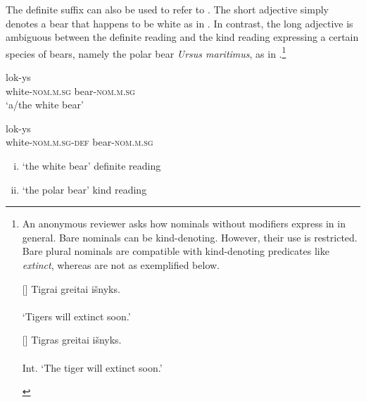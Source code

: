 \documentclass[output=paper,
modfonts
]{langscibook}
\begin{document}
The definite suffix can also be used to refer to  \citep{Rutkowski06}. The short adjective simply denotes a bear that happens to be white as in . \pagebreak In contrast, the long adjective is ambiguous between the definite reading and the kind reading expressing a certain species of bears, namely the polar bear \textit{Ursus maritimus}, as in .\footnote{An anonymous reviewer asks how nominals without modifiers express  in  in general. Bare nominals can be kind-denoting. However, their use is restricted. Bare plural nominals are compatible with kind-denoting predicates like \textit{extinct}, whereas  are not as exemplified below.
	
\begin{exe}
 
\begin{xlist}
[]{\footnotesize
	\gll Tigrai greitai išnyks.\\
  \\
\trans \normalfont `Tigers will extinct soon.'}

[\fts{\#}]{\footnotesize
	\gll Tigras greitai išnyks.\\
  \\
\trans \normalfont Int. `The tiger will extinct soon.'}
\end{xlist}
\end{exe}}

\begin{exe}
\ex \label{ex:sereikaite:11}
\begin{xlist}
\ex \label{ex:sereikaite:11a}
 {lok-ys} \\
white-\textsc{nom.m.sg} bear-\textsc{nom.m.sg} \\
\trans `a/the white bear'  

\ex \label{ex:sereikaite:11b}
 {lok-ys}\\
white-\textsc{nom.m.sg}-\textsc{def} bear-\textsc{nom.m.sg}  \\
\trans 
\begin{enumerate}[(i)]
	\item `the white bear' \checkmark definite reading 
	\item `the polar bear' \checkmark kind reading
\end{enumerate}
 
\end{xlist}
\end{exe}
\end{document}
